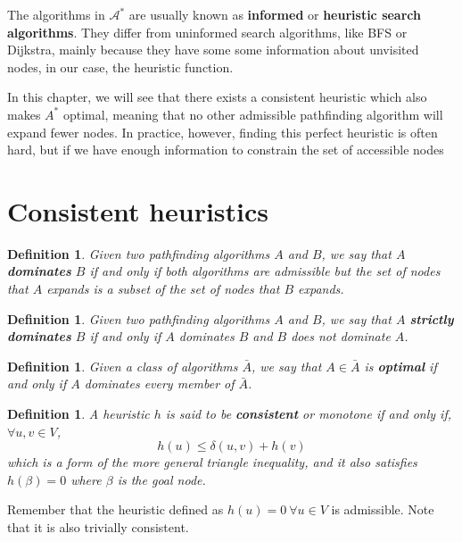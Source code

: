 \documentclass[12pt]{report}
\newtheorem{definition}[theorem]{Definition}
\begin{document}
The algorithms in $\mathcal{A^*}$ are usually known as \textbf{informed} or \textbf{heuristic search algorithms}. They differ from uninformed search algorithms, like BFS or Dijkstra, mainly because they have some some information about unvisited nodes, in our case, the heuristic function.

In this chapter, we will see that there exists a consistent  heuristic which also makes $A^*$ optimal, meaning that no other admissible pathfinding algorithm will expand fewer nodes. In practice, however, finding this perfect heuristic is often hard, but if we have enough information to constrain the set of accessible nodes 

\section{Consistent heuristics}

\begin{definition}
Given two pathfinding algorithms $A$ and $B$, we say that $A$ \textbf{dominates} $B$ if and only if both algorithms are admissible but the set of nodes that $A$ expands is a subset of the set of nodes that $B$ expands.
\end{definition}

\begin{definition}
Given two pathfinding algorithms $A$ and $B$, we say that $A$ \textbf{strictly dominates} $B$ if and only if $A$ dominates $B$ and $B$ does not dominate $A$.
\end{definition}

\begin{definition}
Given a class of algorithms $\bar{A}$, we say that $A \in \bar{A}$ is \textbf{optimal} if and only if $A$ dominates every member of $\bar{A}$.
\end{definition}

\begin{definition}
A heuristic $h$ is said to be \textbf{consistent} or monotone if and only if, $\forall u, v \in V$,
\begin{equation}
	h(u) \leq \delta(u, v) + h(v)\label{eq:consistency}
\end{equation}
which is a form of the more general triangle inequality, and it also satisfies $h(\beta) = 0$ where $\beta$ is the goal node.
\end{definition}

Remember that the heuristic defined as $h(u) = 0 \  \forall u \in V$ is admissible. Note that it is also trivially consistent.
\end{document}
